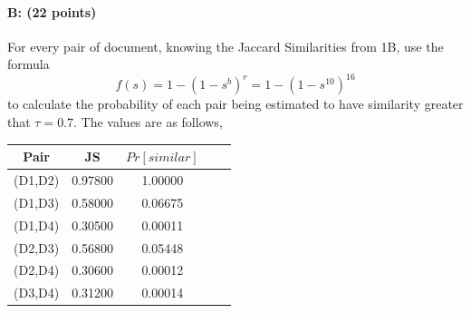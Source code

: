 \documentclass[11pt]{article}
\begin{document}
\paragraph{B: (22 points)}
For every pair of document, knowing the Jaccard Similarities from 1B, use the formula 
$$f(s)=1-(1-s^b)^r=1-(1-s^{10})^{16}$$ 
to calculate the probability of each pair being estimated to have similarity greater that $\tau=0.7$. The values are as follows,
\begin{table}[h]
\centering
\begin{tabular}{c|c|c|c|c}
Pair & JS & $Pr[similar]$\\
\hline
(D1,D2) & 0.97800 & 1.00000 \\
(D1,D3) & 0.58000 & 0.06675 \\
(D1,D4) & 0.30500 & 0.00011 \\
(D2,D3) & 0.56800 & 0.05448 \\
(D2,D4) & 0.30600 & 0.00012 \\
(D3,D4) & 0.31200 & 0.00014 \\
\end{tabular}
\end{table}

\newpage
\end{document}
